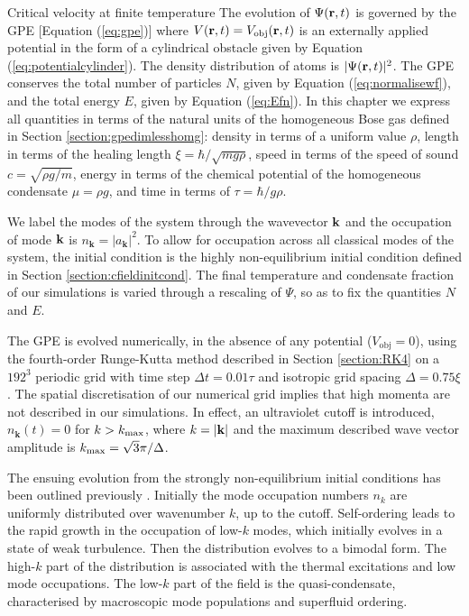 \begin{chapter}{\label{cha:nonequib}Critical velocity at finite temperature}
The evolution of $\Psi({\bf r},t)$ is governed by the GPE [Equation (\ref{eq:gpe})] where $V({\bf r},t) = V_{\mathrm{obj}}({\bf r},t)$ is an externally applied potential in the form of a cylindrical obstacle given by Equation (\ref{eq:potentialcylinder}). The density distribution of atoms is $|\Psi({\bf r},t)|^2$.
The GPE conserves the total number of particles $N$, given by Equation (\ref{eq:normalisewf}), and the total energy $E$, given by Equation (\ref{eq:Efn}). In this chapter we express all quantities in terms of the natural units of the homogeneous Bose gas defined in Section \ref{section:gpedimlesshomg}:  density in terms of a uniform value $\rho$, length in terms of the healing length $\xi=\hbar/\sqrt{m g \rho}$, speed in terms of the speed of sound $c=\sqrt{\rho g/m}$, energy in terms of the chemical potential of the homogeneous condensate $\mu=\rho g$, and time in terms of $\tau=\hbar / g \rho$.

We label the modes of the system through the wavevector ${\bf k}$ and the occupation of mode ${\bf k}$ is $n_{\mathbf{k}}=|a_{\mathbf{k}}|^2$. To allow for occupation across all classical modes of the system, the initial condition is the highly non-equilibrium initial condition defined in Section \ref{section:cfieldinitcond}.  The final temperature and condensate fraction of our simulations is varied through a rescaling of $\Psi$, so as to fix the quantities $N$ and $E$.

The GPE is evolved numerically, in the absence of any potential ($V_{\mathrm{obj}} = 0$), using the fourth-order Runge-Kutta method described in Section \ref{section:RK4} on a $192^3$ periodic grid with time step $\Delta t =0.01 \tau$ and isotropic grid spacing $\Delta =0.75\xi$. The spatial discretisation of our numerical grid implies that high momenta are not described in our simulations. In effect, an ultraviolet cutoff is introduced, $n_{\mathbf{k}}(t)=0$ for $k>k_{\rm{max}}$, where $k=|{\bf k}|$ and the maximum described wave vector amplitude is $k_{\rm{max}} = \sqrt{3} \pi / \Delta$. 

The ensuing evolution from the strongly non-equilibrium initial conditions has been outlined previously \cite{PhysRevA.66.013603,pattinson_2014}.  Initially the mode occupation numbers $n_k$ are uniformly distributed over wavenumber $k$, up to the cutoff.  Self-ordering leads to the rapid growth in the occupation of low-$k$ modes, which initially evolves in a state of weak turbulence.  Then the distribution evolves to a bimodal form.
The high-$k$ part of the distribution is associated with the
thermal excitations and low mode occupations.
The low-$k$ part of the field is the quasi-condensate,
characterised by macroscopic mode populations and superfluid ordering.


\end{chapter}
